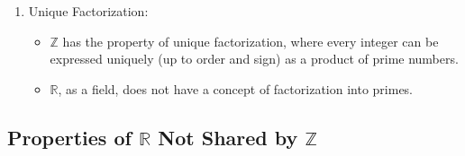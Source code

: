 \begin{enumerate}[topsep=0pt]
    \item Unique Factorization:
     \begin{itemize}
        \item \( \mathbb{Z} \) has the property of unique factorization, where every integer can be expressed uniquely (up to order and sign) as a product of prime numbers.
        \item \( \mathbb{R} \), as a field, does not have a concept of factorization into primes.
    \end{itemize}
\end{enumerate}

\subsection{Properties of \( \mathbb{R} \) Not Shared by \( \mathbb{Z} \)}
